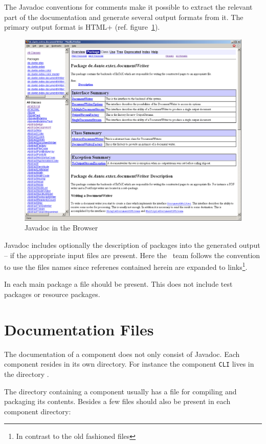The Javadoc conventions for comments make it possible to extract the
relevant part of the documentation and generate several output formats
from it. The primary output format is \+HTML+ (ref. figure~\ref{fig:javadoc}).
\begin{figure}[tbh]
  \centering
  \includegraphics[scale=.33]{image/javadoc}
  \caption{Javadoc in the Browser}\label{fig:javadoc}
\end{figure}

Javadoc includes optionally the description of packages into the
generated output -- if the appropriate input files are present. Here
the \ExTeX\ team follows the convention to use the files names
 since referenes contained herein are expanded
to links\footnote{In contrast to the old fashioned files
  }.

In each main package a file  should be
present. This does not include test packages or resource packages.


\section{Documentation Files}

The documentation of a component does not only consist of Javadoc.
Each component resides in its own directory. For instance the
component \texttt{CLI} lives in the directory .

The directory containing a component usually has a file 
for compiling and packaging its contents. Besides a few files should
also be present in each component directory:

